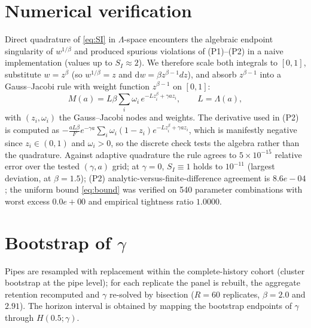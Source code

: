 \documentclass[review,12pt,authoryear]{elsarticle}
\begin{document}
\section{Numerical verification}
\label{app:numerics}
Direct quadrature of \eqref{eq:SI} in $\Lambda$-space encounters the
algebraic endpoint singularity of $w^{1/\beta}$ and produced spurious
violations of (P1)--(P2) in a naive implementation (values up to
$S_I\approx2$). We therefore scale both integrals to $[0,1]$, substitute
$w=z^{\beta}$ (so $w^{1/\beta}=z$ and $\mathrm{d}w=\beta z^{\beta-1}dz$),
and absorb $z^{\beta-1}$ into a Gauss--Jacobi rule with weight function
$z^{\beta-1}$ on $[0,1]$:
\[
M(a)=L\beta\sum_i \omega_i\,e^{-L z_i^{\beta}+\gamma a z_i},
\qquad L=\Lambda(a),
\]
with $(z_i,\omega_i)$ the Gauss--Jacobi nodes and weights. The derivative
used in (P2) is computed as
$-\frac{aL\beta}{F}e^{-\gamma a}\sum_i\omega_i(1-z_i)
e^{-Lz_i^\beta+\gamma a z_i}$, which is manifestly negative since
$z_i\in(0,1)$ and $\omega_i>0$, so the discrete check tests the algebra
rather than the quadrature. Against adaptive quadrature the rule agrees to
$5\times10^{-15}$ relative error over the tested $(\gamma,a)$ grid; at
$\gamma=0$, $S_I\equiv1$ holds to $10^{-11}$ (largest deviation, at
$\beta=1.5$); (P2) analytic-versus-finite-difference agreement is
$8.6e-04$; the uniform bound \eqref{eq:bound} was verified on 540
parameter combinations with worst excess $0.0e+00$ and empirical tightness
ratio $1.0000$.

\section{Bootstrap of $\gamma$}
\label{app:boot}
Pipes are resampled with replacement within the complete-history cohort
(cluster bootstrap at the pipe level); for each replicate the panel is
rebuilt, the aggregate retention recomputed and $\gamma$ re-solved by
bisection ($R=60$ replicates, $\beta=2.0$ and $2.91$). The horizon
interval is obtained by mapping the bootstrap endpoints of $\gamma$ through
$H(0.5;\gamma)$.
\end{document}

